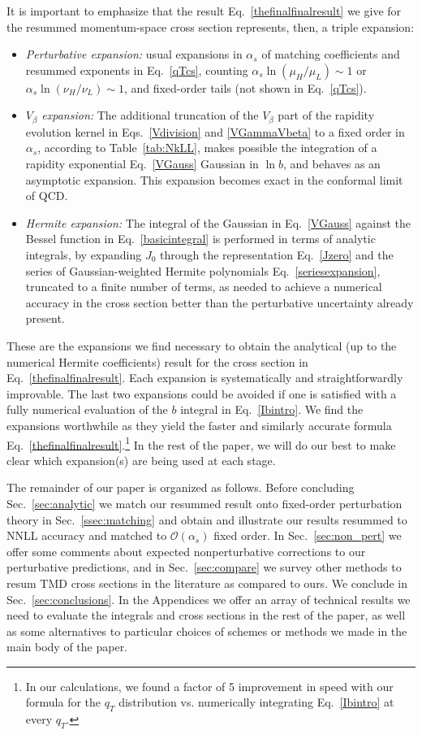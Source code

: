 \documentclass[a4,letterpaper,11pt]{article}
\newcommand{\as}{\alpha_s}
\newcommand{\cO}{\mathcal{O}}
\newcommand{\eq}[1]{Eq.~\eqref{#1}}
\newcommand{\eqs}[2]{Eqs.~\eqref{#1} and \eqref{#2}}
\renewcommand{\sec}[1]{Sec.~\ref{sec:#1}}
\newcommand{\ssec}[1]{Sec.~\ref{ssec:#1}}
\newcommand{\tab}[1]{Table~\ref{tab:#1}}
\begin{document}
It is important to emphasize that the result \eq{thefinalfinalresult} we give for the resummed momentum-space cross section represents, then, a triple expansion:
\begin{itemize}
\item \emph{Perturbative expansion:} usual expansions in $\alpha_s$ of matching coefficients and resummed exponents in \eq{qTcs}, counting $\as \ln(\mu_H/\mu_L)\sim 1$ or $\as \ln(\nu_H/\nu_L)\sim 1$, and fixed-order tails (not shown in \eq{qTcs}).

\item \emph{$V_\beta$ expansion:} The additional truncation of the $V_\beta$ part of the rapidity evolution kernel in \eqs{Vdivision}{VGammaVbeta} to a fixed order in $\as$, according to \tab{NkLL}, makes possible the integration of a rapidity exponential \eq{VGauss} Gaussian in $\ln b$, and behaves as an asymptotic expansion. This expansion becomes exact in the conformal limit of QCD.

\item \emph{Hermite expansion:} The integral of the Gaussian in \eq{VGauss} against the Bessel function in \eq{basicintegral} is performed in terms of analytic integrals, by expanding $J_0$ through the representation \eq{Jzero} and the series of Gaussian-weighted Hermite polynomials \eq{seriesexpansion}, truncated to a finite number of terms, as needed to achieve a numerical accuracy in the cross section better than the perturbative uncertainty already present.
\end{itemize}
These are the expansions we find necessary to obtain the analytical (up to the numerical Hermite coefficients) result for the cross section in \eq{thefinalfinalresult}. Each expansion is systematically and straightforwardly improvable. The last two expansions could be avoided if one is satisfied with a fully numerical evaluation of the $b$ integral in \eq{Ibintro}. We find the expansions worthwhile as they yield the faster and similarly accurate formula \eq{thefinalfinalresult}.\footnote{In our calculations, we found a factor of 5 improvement in speed with our formula for the $q_T$ distribution vs. numerically integrating \eq{Ibintro} at every $q_T$.} In the rest of the paper, we will do our best to make clear which expansion(s) are being used at each stage.

\bigskip

The remainder of our paper is organized as follows. 
Before concluding \sec{analytic}  we match our resummed result onto fixed-order perturbation theory in \ssec{matching}  and obtain and illustrate our results resummed to NNLL accuracy and matched to $\cO(\as)$ fixed order. In \sec{non_pert} we offer some comments about expected nonperturbative corrections to our perturbative predictions, and in \sec{compare} we survey other methods to resum TMD cross sections in the literature as compared to ours. We conclude in \sec{conclusions}. In the Appendices we offer an array of technical results we need to evaluate the integrals and  cross sections in the rest of the paper, as well as some alternatives to particular choices of schemes or methods we made in the main body of the paper.
\end{document}
